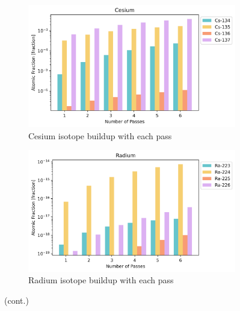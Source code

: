 \begin{figure}[H]\ContinuedFloat
\centering

\begin{subfigure}{0.95\textwidth}
  \includegraphics[width=\linewidth]{figures/compositions/caesium}
  \caption{Cesium isotope buildup with each pass}
  \label{fig:cs}
\end{subfigure}%


\begin{subfigure}{0.95\textwidth}
  \includegraphics[width=\linewidth]{figures/compositions/radium}
  \caption{Radium isotope buildup with each pass}
  \label{fig:ra}
\end{subfigure}%

\caption[]{(cont.)}
\end{figure}

